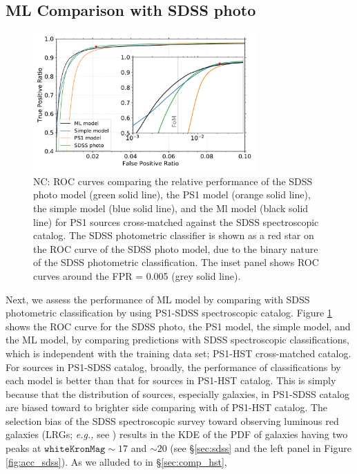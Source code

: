 \documentclass[twocolumn]{aastex62}
\newcommand{\NC}[1]{{\color{brown} NC: {#1}}}
\begin{document}
{\subsection{ML Comparison with SDSS photo}
\begin{figure}[t]
 \centering
  \includegraphics[width=3.35in, bb = 0 0 576 360]{./Figures/ROC_curves.pdf}
  \caption{
  \NC{
  ROC curves comparing the relative performance 
  of the SDSS photo model (green solid line), the PS1 model (orange solid line), 
  the simple model (blue solid line), and the Ml model (black solid line) 
  for PS1 sources cross-matched against the SDSS spectroscopic catalog. 
  The SDSS photometric classifier is shown as a red star on the ROC curve of the SDSS photo model, 
  due to the binary nature of the SDSS photometric classification. 
  The inset panel shows ROC curves around the FPR = 0.005 (grey solid line). 
  }
  }
  \label{fig:roc_sdss}
\end{figure}
Next, we assess the performance of ML model by comparing with SDSS photometric classification 
by using PS1-SDSS spectroscopic catalog. 
Figure \ref{fig:roc_sdss} shows the ROC curve for 
the SDSS photo, the PS1 model, the simple model, and the ML model, 
by comparing predictions with SDSS spectroscopic classifications, 
which is independent with the training data set; PS1-HST cross-matched catalog. 
For sources in PS1-SDSS catalog, broadly, 
the performance of classifications by each model is better than that for sources in PS1-HST catalog. 
This is simply because that the distribution of sources, especially galaxies, in PS1-SDSS catalog 
are biased toward to brighter side comparing with of PS1-HST catalog. 
The selection bias of the SDSS spectroscopic survey 
toward observing luminous red galaxies (LRGs; {\it e.g.,} see \citealt{Eisenstein01}) 
results in the KDE of the PDF of galaxies having two peaks 
at $\mathtt{whiteKronMag} \sim 17$ and $\sim 20$ 
(see \S\ref{sec:sdss} and the left panel in Figure \ref{fig:acc_sdss}). 
As we alluded to in \S\ref{sec:comp_hst}, 
}
\end{document}
